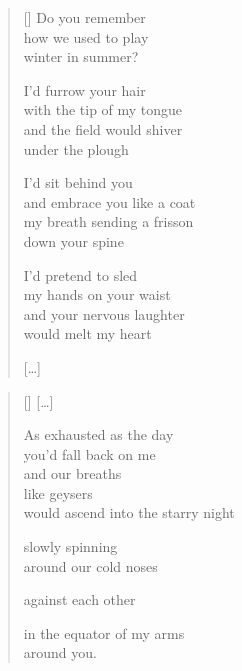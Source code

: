 \documentclass[14pt]{extbook}
\newcommand*{\centeredornament}{\centerline{\pgfornament[width=6cm]{88}}}
\begin{document}

\newpage

\vspace*{-15mm}
\centeredornament
\vspace*{-7mm}


\settowidth{\versewidth}{and embrace you like a coat}

\begin{verse}[\versewidth]
  Do you remember \\
  how we used to play \\
  winter in summer?

  I'd furrow your hair \\
  with the tip of my tongue \\
  and the field would shiver \\
  under the plough

  I'd sit behind you \\
  and embrace you like a coat \\
  my breath sending a frisson \\
  down your spine

  I'd pretend to sled \\
  my hands on your waist \\
  and your nervous laughter \\
  would melt my heart

  \hfill [\ldots]
\end{verse}

\newpage

\vspace*{-15mm}
\centeredornament
\vspace*{-7mm}

\poemtitle*{\phantom{XI}}

\settowidth{\versewidth}{would ascend into the starry night}

\begin{verse}[\versewidth]
  \textnormal{[\ldots]}

  As exhausted as the day \\
  you'd fall back on me \\
  and our breaths \\
  like geysers \\
  would ascend into the starry night

  slowly spinning \\
  around our cold noses

  against each other

  in the equator of my arms \\
  around you.
\end{verse}
\end{document}
